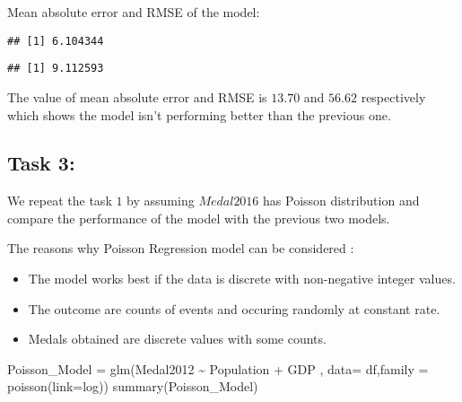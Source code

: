 \documentclass[
]{article}
\newenvironment{Shaded}{\begin{snugshade}}{\end{snugshade}}
\newcommand{\AttributeTok}[1]{\textcolor[rgb]{0.77,0.63,0.00}{#1}}
\newcommand{\CommentTok}[1]{\textcolor[rgb]{0.56,0.35,0.01}{\textit{#1}}}
\newcommand{\FunctionTok}[1]{\textcolor[rgb]{0.00,0.00,0.00}{#1}}
\newcommand{\NormalTok}[1]{#1}
\newcommand{\OtherTok}[1]{\textcolor[rgb]{0.56,0.35,0.01}{#1}}
\newcommand{\SpecialCharTok}[1]{\textcolor[rgb]{0.00,0.00,0.00}{#1}}
\newcommand{\StringTok}[1]{\textcolor[rgb]{0.31,0.60,0.02}{#1}}
\providecommand{\tightlist}{%
  \setlength{\itemsep}{0pt}\setlength{\parskip}{0pt}}
\begin{document}
Mean absolute error and RMSE of the model:

\begin{Shaded}
\end{Shaded}

\begin{verbatim}
## [1] 6.104344
\end{verbatim}

\begin{Shaded}
\end{Shaded}

\begin{verbatim}
## [1] 9.112593
\end{verbatim}

The value of mean absolute error and RMSE is \(13.70\) and \(56.62\)
respectively which shows the model isn't performing better than the
previous one.

\hypertarget{task-3}{%
\subsection{Task 3:}\label{task-3}}

We repeat the task \(1\) by assuming \(Medal2016\) has Poisson
distribution and compare the performance of the model with the previous
two models.

The reasons why Poisson Regression model can be considered :

\begin{itemize}
\tightlist
\item
  The model works best if the data is discrete with non-negative integer
  values.
\item
  The outcome are counts of events and occuring randomly at constant
  rate.
\item
  Medals obtained are discrete values with some counts.
\end{itemize}

\begin{Shaded}
\begin{Highlighting}[]
\NormalTok{Poisson\_Model }\OtherTok{=} \FunctionTok{glm}\NormalTok{(Medal2012 }\SpecialCharTok{\textasciitilde{}}\NormalTok{ Population }\SpecialCharTok{+}\NormalTok{ GDP , }\AttributeTok{data=}\NormalTok{ df,}\AttributeTok{family =} \FunctionTok{poisson}\NormalTok{(}\AttributeTok{link=}\StringTok{\textquotesingle{}log\textquotesingle{}}\NormalTok{))}
\FunctionTok{summary}\NormalTok{(Poisson\_Model)}
\end{Highlighting}
\end{Shaded}
\end{document}
